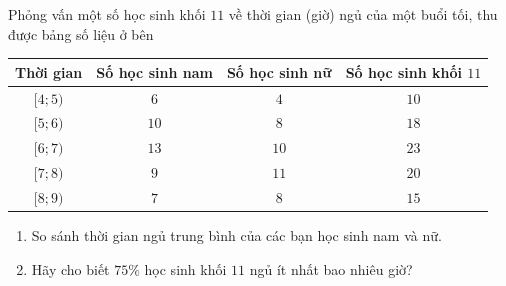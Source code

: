 \begin{ex}%
	Phỏng vấn một số học sinh khối $11$ về thời gian (giờ) ngủ  của một buổi tối, thu được bảng số liệu ở bên
	\begin{center}
		\begin{tabular}{|c|c|c|c|}
			 \hline
			Thời gian & Số học sinh nam & Số học sinh nữ & Số học sinh khối $11$  \\
			\hline 
			 $[4;5)$ & $6$ & $4$ & $10$ \\
			\hline 
			$[5;6)$ & $10$ & $8$  & $18$ \\
			\hline 
			 $[6;7)$ & $13$ & $10$ & $23$ \\
			\hline 
			$[7;8)$ & $9$  & $11$ & $20$ \\
			\hline 
			$[8;9)$ & $7$ & $8$ & $15$ \\ 
			 \hline
		\end{tabular}
	\end{center}
	\begin{enumerate}
		\item So sánh thời gian ngủ trung bình của các bạn học sinh  nam và nữ.
		\item Hãy cho  biết $75\%$ học sinh khối $11$ ngủ ít nhất bao nhiêu giờ?
	\end{enumerate}
\end{ex}

